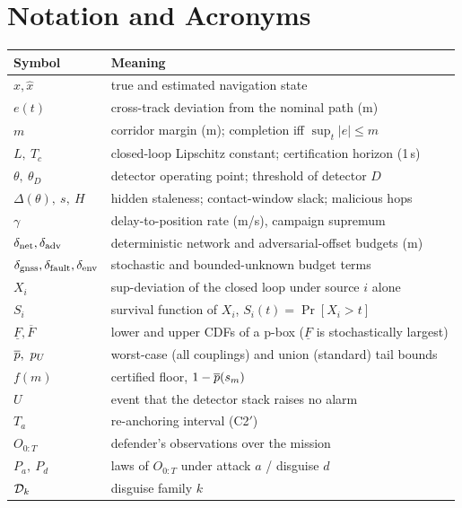 \section{Notation and Acronyms}
\label{app:notation}
\begin{center}\footnotesize
\begin{tabularx}{\columnwidth}{@{}l>{\raggedright\arraybackslash}X@{}}
\toprule
\textbf{Symbol} & \textbf{Meaning} \\
\midrule
$x,\hat x$ & true and estimated navigation state \\
$e(t)$ & cross-track deviation from the nominal path (m) \\
$m$ & corridor margin (m); completion iff $\sup_t|e|\le m$ \\
$L,\ T_c$ & closed-loop Lipschitz constant; certification horizon (1\,s) \\
$\theta,\ \theta_D$ & detector operating point; threshold of detector $D$ \\
$\Delta(\theta),\ s,\ H$ & hidden staleness; contact-window slack; malicious hops \\
$\gamma$ & delay-to-position rate (m/s), campaign supremum \\
$\delta_{\mathrm{net}},\delta_{\mathrm{adv}}$ & deterministic network and adversarial-offset budgets (m) \\
$\delta_{\mathrm{gnss}},\delta_{\mathrm{fault}},\delta_{\mathrm{env}}$ & stochastic and bounded-unknown budget terms \\
$X_i$ & sup-deviation of the closed loop under source $i$ alone \\
$S_i$ & survival function of $X_i$, $S_i(t)=\Pr[X_i>t]$ \\
$\underline F,\overline F$ & lower and upper CDFs of a p-box ($\underline F$ is stochastically largest) \\
$\pbar,\ p_U$ & worst-case (all couplings) and union (standard) tail bounds \\
$f(m)$ & certified floor, $1-\overline{p}(s_m)$ \\
$U$ & event that the detector stack raises no alarm \\
$T_a$ & re-anchoring interval (C2$'$) \\
$O_{0:T}$ & defender's observations over the mission \\
$P_a,\ P_d$ & laws of $O_{0:T}$ under attack $a$ / disguise $d$ \\
$\mathcal{D}_k$ & disguise family $k$ \\
\bottomrule
\end{tabularx}


\end{center}
